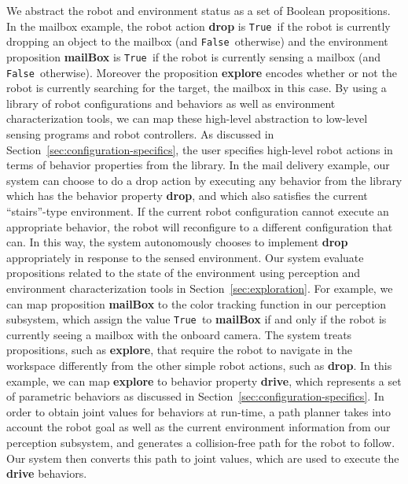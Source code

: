\documentclass[journal]{IEEEtran}
\newcommand{\lt}{{\tt True }}
\newcommand{\lf}{{\tt False }}
\begin{document}
We abstract the robot and environment status as a set of Boolean propositions.
In the mailbox example, the robot action \textbf{drop} is \lt if the robot is currently dropping an object to the mailbox (and \lf otherwise) and the environment proposition \textbf{mailBox} is \lt if the robot is currently sensing a mailbox (and \lf otherwise).
Moreover the proposition \textbf{explore} encodes whether or not the robot is currently searching for the target, the mailbox in this case.
By using a library of robot configurations and behaviors as well as environment characterization tools, we can map these high-level abstraction to low-level sensing programs and robot controllers.
As discussed in Section~\ref{sec:configuration-specifics}, the user specifies high-level robot actions in terms of behavior properties from the library. 
In the mail delivery example, our system can choose to do a drop action by executing any behavior from the library which has the behavior property \textbf{drop}, and which also satisfies the current ``stairs''-type environment. If the current robot configuration cannot execute an appropriate behavior, the robot will reconfigure to a different configuration that can.  In this way, the system autonomously chooses to implement  \textbf{drop}  appropriately in response to the sensed environment.
Our system evaluate propositions related to the state of the environment using perception and environment characterization tools in Section~\ref{sec:exploration}. For example, we can map proposition \textbf{mailBox} to the color tracking function in our perception subsystem, which assign the value \lt to \textbf{mailBox} if and only if the robot is currently seeing a mailbox with the onboard camera.
The system treats propositions, such as \textbf{explore}, that require the robot to navigate in the workspace differently from the other simple robot actions, such as \textbf{drop}.
In this example, we can map \textbf{explore} to behavior property \textbf{drive}, which represents a set of parametric behaviors as discussed in Section~\ref{sec:configuration-specifics}.
In order to obtain joint values for behaviors at run-time, a path planner takes into account the robot goal as well as the current environment information from  our perception subsystem, and generates a collision-free path for the robot to follow.
Our system then converts this path to joint values, which are used to execute the \textbf{drive} behaviors.
\end{document}
